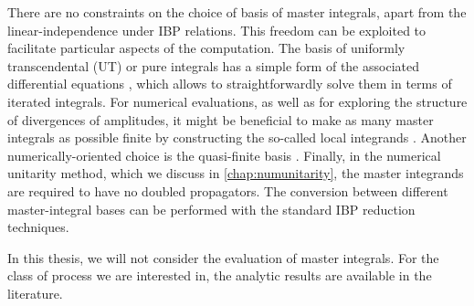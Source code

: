There are no constraints on the choice of basis of master integrals, apart from the linear-independence under IBP relations. 
This freedom can be exploited to facilitate particular aspects of the computation.
The basis of uniformly transcendental (UT) or pure integrals \cite{ArkaniHamed:2010gh} has a simple form of the
associated differential equations \cite{Henn:2013pwa}, which allows to straightforwardly solve them in terms of iterated integrals.
For numerical evaluations, as well as for exploring the structure of divergences of amplitudes,
it might be beneficial to make as many master integrals as possible finite by constructing the so-called local integrands \cite{ArkaniHamed:2010kv,ArkaniHamed:2010gh,Badger:2016ozq,Badger:2016egz}.
Another numerically-oriented choice is the quasi-finite basis \cite{vonManteuffel:2014qoa,Panzer:2014gra}.
Finally, in the numerical unitarity method, which we discuss in \cref{chap:numunitarity}, the master integrands are required to have no doubled propagators.
The conversion between different master-integral bases can be performed with the standard IBP reduction techniques.


In this thesis, we will not consider the evaluation of master integrals.
For the class of process we are interested in, the analytic results are available in the literature.
